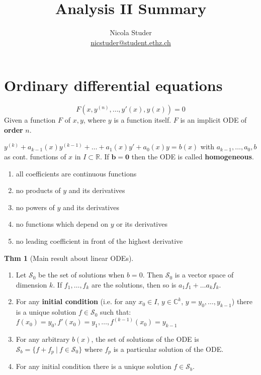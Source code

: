 \documentclass[a4paper, 10pt]{article}
\title{Analysis II Summary}
\author{Nicola Studer \\ \href{mailto:nicstuder@student.ethz.ch}{nicstuder@student.ethz.ch}}
\date{\vspace{-5ex}}
\theoremstyle{definition}
\newtheorem*{theorem}{Thm}
\newcommand{\R}{\mathbb{R}}
\newcommand{\C}{\mathbb{C}}
\begin{document}
\maketitle

\section{Ordinary differential equations}
\[F(x, y^{(n)}, \ldots, y'(x), y(x)) = 0\]
Given a function \(F\) of \(x, y\), where \(y\) is a function itself. \(F\) is an implicit ODE of \textbf{order} \(n\).

\begin{note*}
    \(y^{(k)} + a_{k-1}(x)y^{(k-1)} + \ldots + a_1(x)y' + a_0(x)y = b(x)\)
    with \(a_{k-1}, \ldots, a_0, b\) as cont. functions of \(x\) in \(I \subset \R\). If \(\bm{b = 0}\) then the ODE is called \textbf{homogeneous}.
\end{note*}

\begin{ntheorem*}
    \begin{enumerate}
        \item all coefficients are continuous functions
        \item no products of \(y\) and its derivatives
        \item no powers of \(y\) and its derivatives
        \item no functions which depend on \(y\) or its derivatives
        \item no leading coefficient in front of the highest derivative
    \end{enumerate}
\end{ntheorem*}

\begin{theorem}[Main result about linear ODEs]
    \(\;\)
    \begin{enumerate}
        \item Let \(\mathcal{S}_0\) be the set of solutions when \(b = 0\). Then \(\mathcal{S}_0\) is a vector space of dimension \(k\). If \(f_1, \ldots, f_k\) are the solutions, then so is \(a_1f_1+ \ldots a_kf_k\).
        \item For any \textbf{initial condition} (i.e. for any \(x_0 \in I\), \(y \in \C^k\), \(y = y_0, \ldots, y_{k-1}\)) there is a unique solution \(f \in \mathcal{S}_0\) such that: \\
        \(f(x_0) = y_0, f'(x_0) = y_1, \ldots, f^{(k-1)}(x_0) = y_{k-1}\)
        \item For any arbitrary \(b(x)\), the set of solutions of the ODE is \(\mathcal{S}_b = \{f + f_p \ | \ f \in \mathcal{S}_0\}\) where \(f_p\) is a particular solution of the ODE.
        \item For any initial condition there is a unique solution \(f \in \mathcal{S}_b\).
    \end{enumerate}
\end{theorem}
\end{document}
